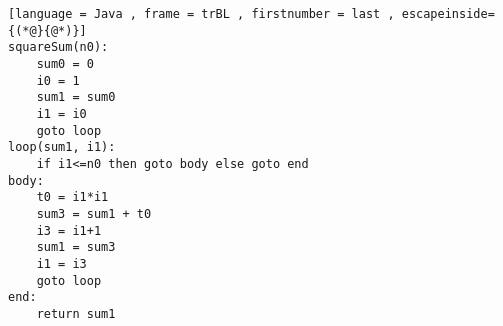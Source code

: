 \begin{lstlisting}[language = Java , frame = trBL , firstnumber = last , escapeinside={(*@}{@*)}]
squareSum(n0):
    sum0 = 0
    i0 = 1
    sum1 = sum0
    i1 = i0
    goto loop
loop(sum1, i1):
    if i1<=n0 then goto body else goto end
body:
    t0 = i1*i1
    sum3 = sum1 + t0
    i3 = i1+1
    sum1 = sum3
    i1 = i3
    goto loop
end:
    return sum1
\end{lstlisting}